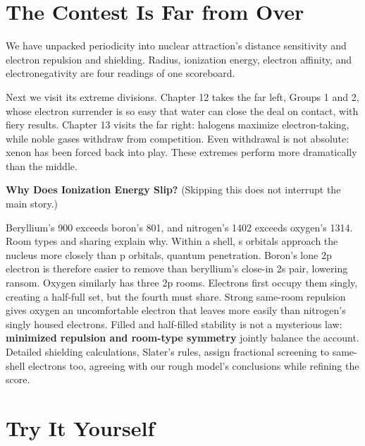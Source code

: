 \section{The Contest Is Far from Over}

We have unpacked periodicity into nuclear attraction's distance sensitivity and electron repulsion and shielding. Radius, ionization energy, electron affinity, and electronegativity are four readings of one scoreboard.

Next we visit its extreme divisions. Chapter 12 takes the far left, Groups 1 and 2, whose electron surrender is so easy that water can close the deal on contact, with fiery results. Chapter 13 visits the far right: halogens maximize electron-taking, while noble gases withdraw from competition. Even withdrawal is not absolute: xenon has been forced back into play. These extremes perform more dramatically than the middle.

\begin{tiaozhan}
\textbf{Why Does Ionization Energy Slip?} (Skipping this does not interrupt the main story.)

Beryllium's 900 exceeds boron's 801, and nitrogen's 1402 exceeds oxygen's 1314. Room types and sharing explain why. Within a shell, s orbitals approach the nucleus more closely than p orbitals, quantum penetration. Boron's lone 2p electron is therefore easier to remove than beryllium's close-in 2s pair, lowering ransom. Oxygen similarly has three 2p rooms. Electrons first occupy them singly, creating a half-full set, but the fourth must share. Strong same-room repulsion gives oxygen an uncomfortable electron that leaves more easily than nitrogen's singly housed electrons. Filled and half-filled stability is not a mysterious law: \textbf{minimized repulsion and room-type symmetry} jointly balance the account. Detailed shielding calculations, Slater's rules, assign fractional screening to same-shell electrons too, agreeing with our rough model's conclusions while refining the score.
\end{tiaozhan}

\section*{Try It Yourself}

